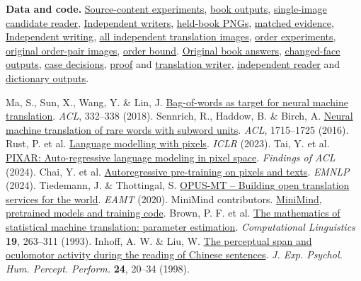 \documentclass[10pt,a4paper]{article}
\newcommand{\repo}[2]{\href{https://github.com/lachlanchen/ImagizedLanguageModel/blob/main/#1}{\underline{#2}}}
\begin{document}
\small\noindent\textbf{Data and code.} \repo{references/source_supported_writing_result.md}{Source-content experiments}, \repo{publication/ilm-nature/evidence/source_supported_writing.zip}{book outputs}, \repo{scripts/select_visual_translation.py}{single-image candidate reader}, \repo{models/independent_optical_actions}{Independent writers}, \repo{publication/ilm-nature/evidence/independent_optical_actions.zip}{held-book PNGs}, \repo{references/independent_optical_actions_result.md}{matched evidence}, \repo{references/sentence_reconstruction_result.md}{Independent writing}, \repo{publication/ilm-nature/evidence/sentence_reconstruction_answers.zip}{all independent translation images}, \repo{references/visual_order_result.md}{order experiments}, \repo{publication/ilm-nature/evidence/visual_order_answers.zip}{original order-pair images}, \repo{formal/span_list/VisualFieldOrder.lean}{order bound}. \repo{publication/ilm-nature/evidence/pictured_path_answers.zip}{Original book answers}, \repo{publication/ilm-nature/evidence/pictured_path_serif.zip}{changed-face outputs}, \repo{references/evidence/pictured_path_translation_v1}{case decisions}, \repo{formal/span_list/SourcePathRepair.lean}{proof} and \repo{scripts/write_optical_span.py}{translation writer}, \repo{models/origin_value_reader}{independent reader} and \repo{publication/ilm-nature/evidence/grounded_origin_answers.zip}{dictionary outputs}.\par
{\footnotesize
\begin{thebibliography}{8}\setlength{\itemsep}{0pt}
 Ma, S., Sun, X., Wang, Y. \& Lin, J. \href{https://aclanthology.org/P18-2053/}{Bag-of-words as target for neural machine translation}. \textit{ACL}, 332--338 (2018).
 Sennrich, R., Haddow, B. \& Birch, A. \href{https://aclanthology.org/P16-1162/}{Neural machine translation of rare words with subword units}. \textit{ACL}, 1715--1725 (2016).
 Rust, P. et al. \href{https://arxiv.org/abs/2207.06991}{Language modelling with pixels}. \textit{ICLR} (2023).
 Tai, Y. et al. \href{https://aclanthology.org/2024.findings-acl.874/}{PIXAR: Auto-regressive language modeling in pixel space}. \textit{Findings of ACL} (2024).
 Chai, Y. et al. \href{https://aclanthology.org/2024.emnlp-main.182/}{Autoregressive pre-training on pixels and texts}. \textit{EMNLP} (2024).
 Tiedemann, J. \& Thottingal, S. \href{https://aclanthology.org/2020.eamt-1.61/}{OPUS-MT -- Building open translation services for the world}. \textit{EAMT} (2020).
 MiniMind contributors. \href{https://github.com/jingyaogong/minimind/tree/858008eb98da4428f78053a1cc4d3a3bd5973629}{MiniMind, pretrained models and training code}.
 Brown, P. F. et al. \href{https://aclanthology.org/J93-2003/}{The mathematics of statistical machine translation: parameter estimation}. \textit{Computational Linguistics} \textbf{19}, 263--311 (1993).
 Inhoff, A. W. \& Liu, W. \href{https://pubmed.ncbi.nlm.nih.gov/9483822/}{The perceptual span and oculomotor activity during the reading of Chinese sentences}. \textit{J. Exp. Psychol. Hum. Percept. Perform.} \textbf{24}, 20--34 (1998).
\end{thebibliography}}
\end{document}
